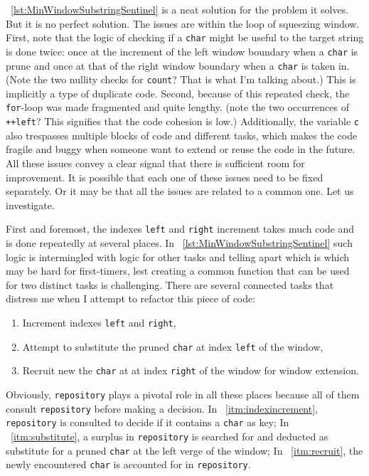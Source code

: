 \documentclass[oneside,11pt]{book}
\theoremstyle{definition}
\theoremstyle{remark}
\newcommand{\code}[1]{\mbox{\lstinline{#1}}}
\begin{document}
~\autoref{lst:MinWindowSubstringSentinel} is a neat solution for the problem it solves.
But it is no perfect solution.
The issues are within the loop of squeezing window.
First, note that the logic of checking if a \code{char} might be useful to
the target string is done twice: once at the increment of the left window boundary when a \code{char} is
prune and once at that of the right window boundary when a \code{char} is taken in.
(Note the two nullity checks for \code{count}? That is what I'm talking about.)
This is implicitly a type of duplicate code.
Second, because of this repeated check, the \code{for}-loop was made fragmented and quite lengthy.
(note the two occurrences of \code{++left}? This signifies that the code cohesion is low.)
Additionally, the variable \code{c} also trespasses multiple blocks of code and different tasks,
which makes the code fragile and buggy when someone want to extend or reuse the code in the future.
All these issues convey a clear signal that there is sufficient room for improvement.
It is possible that each one of these issues need to be fixed separately.
Or it may be that all the issues are related to a common one.
Let us investigate.

First and foremost, the indexes \code{left} and \code{right} increment takes much code and is
done repeatedly at several places.
In ~\autoref{lst:MinWindowSubstringSentinel} such logic is intermingled with logic for other
tasks and telling apart which is which may be hard for first-timers, lest creating a common
function that can be used for two distinct tasks is challenging.
There are several connected tasks that distress me when I attempt to refactor this piece of code:
\begin{enumerate}[label={Task \arabic*}]
    \item\label{itm:indexincrement} Increment indexes \code{left} and \code{right},
    \item\label{itm:substitute} Attempt to substitute the pruned \code{char} at index \code{left} of
    the window,
    \item\label{itm:recruit} Recruit new the \code{char} at at index \code{right} of
    the window for window extension.
\end{enumerate}
Obviously, \code{repository} plays a pivotal role in all these places because all of them consult
\code{repository} before making a decision.
In ~\ref{itm:indexincrement}, \code{repository} is consulted to decide if it contains a \code{char} as key;
In ~\ref{itm:substitute}, a surplus in \code{repository} is searched for and deducted as substitute
for a pruned \code{char} at the left verge of the window;
In ~\ref{itm:recruit}, the newly encountered \code{char} is accounted for in \code{repository}.
\end{document}
